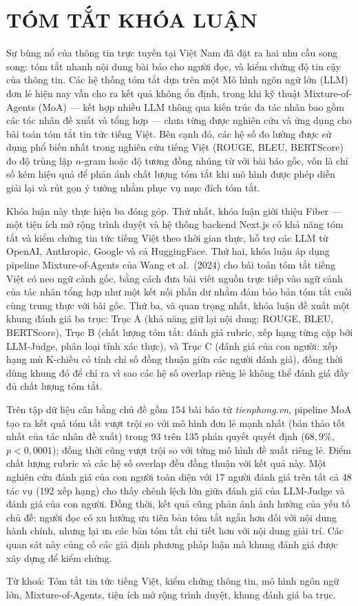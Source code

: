 \chapter*{TÓM TẮT KHÓA LUẬN}

Sự bùng nổ của thông tin trực tuyến tại Việt Nam đã đặt ra hai nhu cầu song song: tóm tắt
nhanh nội dung bài báo cho người đọc, và kiểm chứng độ tin cậy của thông tin. Các hệ thống tóm tắt dựa trên một Mô hình ngôn ngữ lớn (LLM) đơn lẻ hiện nay vẫn cho ra kết quả không ổn định, trong khi kỹ thuật Mixture-of-Agents (MoA) --- kết hợp nhiều LLM thông qua kiến trúc đa tác nhân
bao gồm các tác nhân đề xuất và tổng hợp --- chưa từng được nghiên cứu và ứng dụng cho bài toán tóm tắt tin
tức tiếng Việt. Bên cạnh đó, các hệ số đo lường được sử dụng phổ biến nhất trong
nghiên cứu tiếng Việt (ROUGE, BLEU, BERTScore) đo độ trùng lặp $n$-gram hoặc độ
tương đồng nhúng từ với bài báo gốc, vốn là chỉ số kém hiệu quả để phản ánh chất
lượng tóm tắt khi mô hình được phép diễn giải lại và rút gọn ý tưởng nhằm phục vụ mục đích tóm tắt.

Khóa luận này thực hiện ba đóng góp. Thứ nhất, khóa luận giới thiệu
Fiber --- một tiện ích mở rộng trình duyệt và hệ thống backend Next.js có khả
năng tóm tắt và kiểm chứng tin tức tiếng Việt theo thời gian thực, hỗ trợ các LLM
từ OpenAI, Anthropic, Google và cả HuggingFace. Thứ hai, khóa luận áp dụng
pipeline Mixture-of-Agents của Wang et al.\ (2024) cho bài toán tóm tắt tiếng Việt có
neo ngữ cảnh gốc, bằng cách đưa bài viết nguồn trực tiếp vào ngữ cảnh của tác nhân
tổng hợp như một kết nối phần dư nhằm đảm bảo bản tóm
tắt cuối cùng trung thực với bài gốc. Thứ ba, và quan trọng nhất, khóa luận
đề xuất một khung đánh giá ba trục: Trục A (khả năng giữ lại nội dung: ROUGE, BLEU,
BERTScore), Trục B (chất lượng tóm tắt: đánh giá rubric, xếp hạng từng
cặp bởi LLM-Judge, phân loại tính xác thực), và Trục C (đánh giá của con người: xếp
hạng mù K-chiều có tính chỉ số đồng thuận giữa các người đánh giá), đồng thời dùng
khung đó để chỉ ra vì sao các hệ số overlap riêng lẻ không thể đánh giá đầy đủ chất
lượng tóm tắt.

Trên tập dữ liệu cân bằng chủ đề gồm 154 bài báo từ \textit{tienphong.vn}, pipeline
MoA tạo ra kết quả tóm tắt vượt trội so với mô hình đơn lẻ mạnh nhất (bản thảo tốt nhất của tác nhân đề xuất) trong
93 trên 135 phán quyết quyết định ($68,9\%$, $p < 0,0001$); đồng thời
cũng vượt trội so với từng mô hình đề xuất riêng lẻ. Điểm chất lượng rubric và các
hệ số overlap đều đồng thuận với kết quả này. Một nghiên cứu đánh giá của con người toàn
diện với 17 người đánh giá trên tất cả 48 tác vụ (192 xếp hạng) cho thấy chênh lệch lớn giữa đánh giá của LLM-Judge và đánh giá của con người. 
Đồng thời, kết quả cũng phản ánh ảnh hưởng của yếu tố chủ đề: người đọc có xu hướng ưu tiên bản tóm tắt ngắn hơn đối với nội dung hành chính, nhưng lại ưa các bản tóm tắt chi tiết hơn với nội dung giải trí.
Các quan sát này củng cố các giả định phương pháp luận mà khung đánh giá được xây dựng để kiểm chứng.

\vspace{0.4em}
Từ khoá: Tóm tắt tin tức tiếng Việt, kiểm chứng thông tin, mô hình ngôn ngữ
lớn, Mixture-of-Agents, tiện ích mở rộng trình duyệt, khung đánh giá
ba trục.
